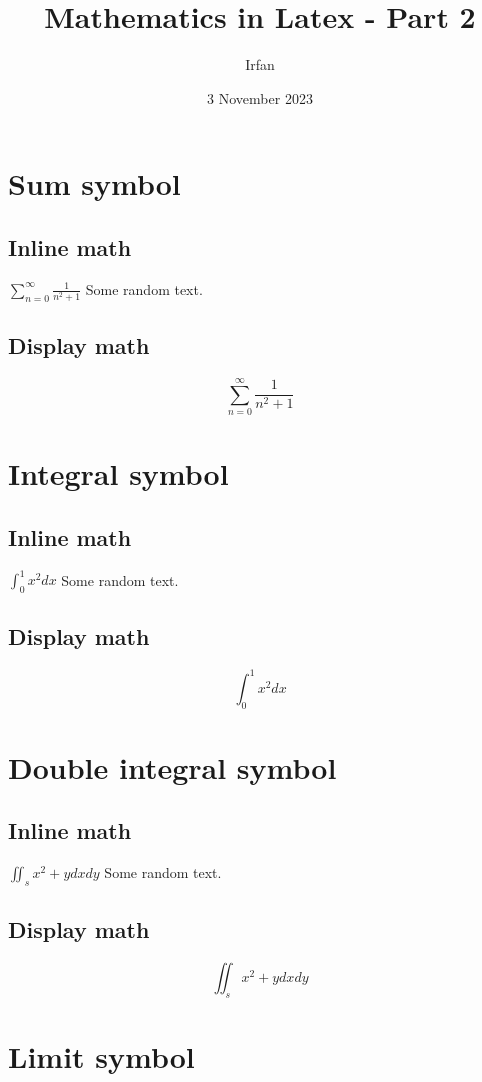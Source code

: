 \documentclass{article}
\title{Mathematics in Latex - Part 2}
\author{Irfan}
\date{3 November 2023}
\theoremstyle{definition}
\theoremstyle{remark}
\begin{document}
\maketitle

\section{Sum symbol}
  \subsection{Inline math}
    $\sum_{n=0}^{\infty}\frac{1}{n^2+1}$ Some random text.

  \subsection{Display math}
    \[\sum_{n=0}^{\infty}\frac{1}{n^2+1}\]

\section{Integral symbol}
  \subsection{Inline math}
    $\int_{0}^{1}x^2dx$ Some random text.

  \subsection{Display math}
    \[\int_{0}^{1}x^2dx\]

\section{Double integral symbol}
  \subsection{Inline math}
    $\iint_{s}x^2+ydxdy$ Some random text.

  \subsection{Display math}
    \[\iint_{s}x^2+ydxdy\]

\section{Limit symbol}
\end{document}
